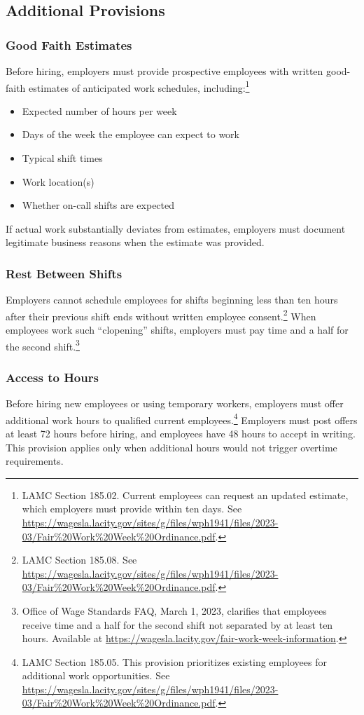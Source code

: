\documentclass[letterpaper,11pt,leqno]{article}
\theoremstyle{paper}
\begin{document}
\subsection{Additional Provisions}

\subsubsection{Good Faith Estimates}
Before hiring, employers must provide prospective employees with written good-faith estimates of anticipated work schedules, including:\footnote{LAMC Section 185.02. Current employees can request an updated estimate, which employers must provide within ten days. See \url{https://wagesla.lacity.gov/sites/g/files/wph1941/files/2023-03/Fair\%20Work\%20Week\%20Ordinance.pdf}.}
\begin{itemize}
   \item Expected number of hours per week
   \item Days of the week the employee can expect to work
   \item Typical shift times
   \item Work location(s)
   \item Whether on-call shifts are expected
\end{itemize}

If actual work substantially deviates from estimates, employers must document legitimate business reasons when the estimate was provided.

\subsubsection{Rest Between Shifts}
Employers cannot schedule employees for shifts beginning less than ten hours after their previous shift ends without written employee consent.\footnote{LAMC Section 185.08. See \url{https://wagesla.lacity.gov/sites/g/files/wph1941/files/2023-03/Fair\%20Work\%20Week\%20Ordinance.pdf}.} When employees work such ``clopening'' shifts, employers must pay time and a half for the second shift.\footnote{Office of Wage Standards FAQ, March 1, 2023, clarifies that employees receive time and a half for the second shift not separated by at least ten hours. Available at \url{https://wagesla.lacity.gov/fair-work-week-information}.}

\subsubsection{Access to Hours}
Before hiring new employees or using temporary workers, employers must offer additional work hours to qualified current employees.\footnote{LAMC Section 185.05. This provision prioritizes existing employees for additional work opportunities. See \url{https://wagesla.lacity.gov/sites/g/files/wph1941/files/2023-03/Fair\%20Work\%20Week\%20Ordinance.pdf}.} Employers must post offers at least 72 hours before hiring, and employees have 48 hours to accept in writing. This provision applies only when additional hours would not trigger overtime requirements.
\end{document}

